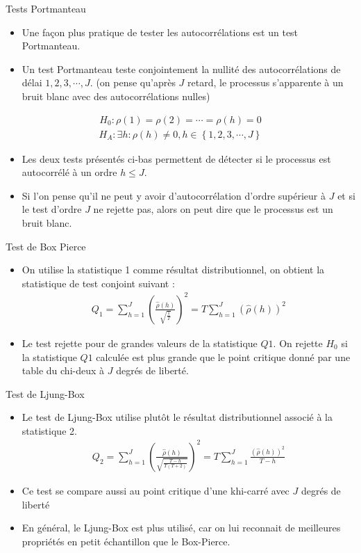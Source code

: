 \documentclass{beamer}
\begin{document}
\begin{frame}{Tests Portmanteau}
\begin{itemize}
\item Une façon plus pratique de tester les autocorrélations est un test Portmanteau. 
\item Un test Portmanteau teste conjointement la nullité des autocorrélations de délai $1, 2, 3,\cdots , J$. (on pense qu’après $J$ retard, le processus s’apparente à un bruit blanc avec des autocorrélations nulles)
\end{itemize}
\begin{align*}
H_0: \rho(1) = \rho(2) = \cdots =\rho(h)=0
\end{align*}
\begin{align*}
H_A: \exists h:	 \rho(h) \neq 0, h \in \left\{ 1,2,3,\cdots,J \right\} 
\end{align*}

\begin{itemize}
\item Les deux tests présentés ci-bas permettent de détecter si le processus est autocorrélé  à un ordre $h \leq J$. 
\item Si l’on pense qu’il ne peut y avoir d’autocorrélation d’ordre supérieur à $J$ et si le test d’ordre $J$ ne rejette pas, alors on peut dire que le processus est un bruit blanc.
\end{itemize}
\end{frame}

\begin{frame}{Test de Box Pierce}
\begin{itemize}
\item On utilise la statistique 1 comme résultat distributionnel, on obtient la statistique de test conjoint suivant :
\begin{align*}
Q_1=\sum_{h=1}^J \left(\frac{\hat{\rho}(h)}{\sqrt{\frac{1}{T}}}\right)^2=T\sum_{h=1}^J(\hat{\rho}(h))^2
\end{align*}
\item Le test rejette pour de grandes valeurs de la statistique $Q1$. On rejette  $H_0$ si la statistique $Q1$ calculée est plus grande que le point critique donné par une table du chi-deux à $J$ degrés de liberté. 
\end{itemize}
\end{frame}

\begin{frame}{Test de Ljung-Box}
\begin{itemize}
\item Le test de Ljung-Box utilise plutôt le résultat distributionnel associé à la statistique 2.
\begin{align*}
Q_2=\sum_{h=1}^J \left(\frac{\hat{\rho}(h)}{\sqrt{\frac{T-h}{T(T+2)}}}\right)^2=T\sum_{h=1}^J \frac{(\hat{\rho}(h))^2}{T-h}
\end{align*}
\item Ce test se compare aussi au point critique d’une khi-carré avec $J$ degrés de liberté
\item En général, le Ljung-Box est plus utilisé, car on lui reconnait de meilleures propriétés en petit échantillon que le Box-Pierce.
\end{itemize}
\end{frame}
\end{document}
